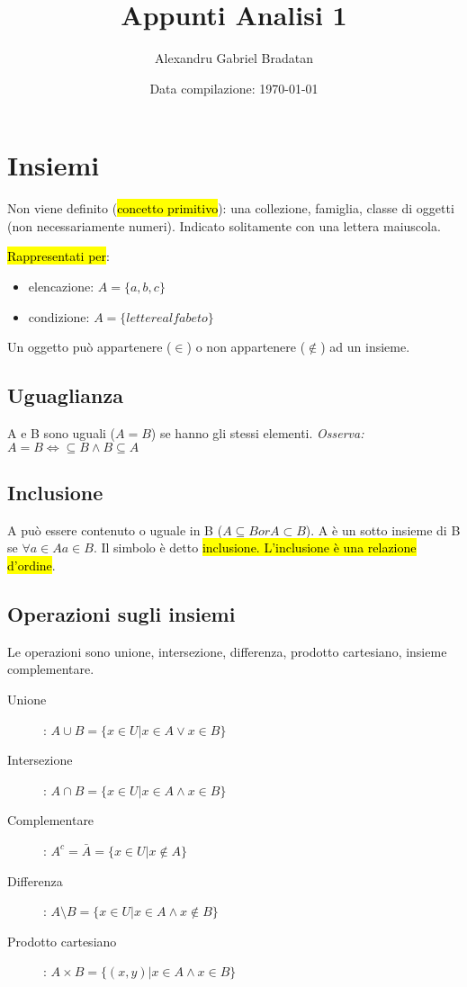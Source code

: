 \documentclass[a4paper,12pt,oneside]{article}
\title{Appunti Analisi 1}
\author{Alexandru Gabriel Bradatan}
\date{Data compilazione: \today}
\begin{document}
\maketitle
\tableofcontents

\section{Insiemi}
Non viene definito (\hl{concetto primitivo}): una collezione, famiglia,
classe di oggetti (non necessariamente numeri). Indicato solitamente con una
lettera maiuscola.

\hl{Rappresentati per}:
\begin{itemize}
    \item elencazione: \(A = \{a, b, c\}\)
    \item condizione: \(A = \{lettere alfabeto\}\)
\end{itemize}

Un oggetto può appartenere ($\in$) o non appartenere ($\notin$) ad un insieme.

\subsection{Uguaglianza}
A e B sono uguali ($A = B$) se hanno gli stessi elementi.
\textit{Osserva: $A = B \iff \subseteq B \wedge B \subseteq A$}

\subsection{Inclusione}
A può essere contenuto o uguale in B ($A \subseteq B or A \subset B$).
A è un sotto insieme di B se $\forall a \in A a \in B$. Il simbolo è detto
\hl{inclusione. L'inclusione è una relazione d'ordine}.

\subsection{Operazioni sugli insiemi}
Le operazioni sono unione, intersezione, differenza, prodotto cartesiano,
insieme complementare.

\begin{description}
    \item[Unione]: $A \cup B = \{ x \in U | x \in A \vee x \in B \}$
    \item[Intersezione]: $A \cap B = \{ x \in U | x \in A \wedge x \in B \}$
    \item[Complementare]: $A^c = \bar{A} = \{ x \in U | x \notin A \}$
    \item[Differenza]: $A \setminus B = \{ x \in U | x \in A \wedge x \notin B \}$
    \item[Prodotto cartesiano]: $A \times B = \{ (x,y) | x \in A \wedge x \in B \}$
\end{description}
\end{document}
